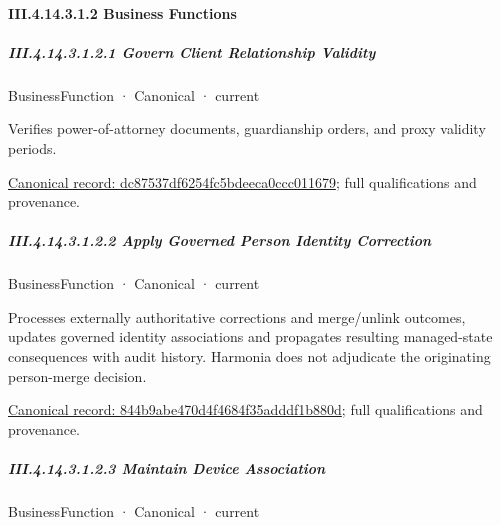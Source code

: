 \paragraph*{III.4.14.3.1.2 Business Functions}
\label{navigation:III.4.14.3.1.2}

\subparagraph*{III.4.14.3.1.2.1 Govern Client Relationship Validity}
\label{navigation:III.4.14.3.1.2.1}

\label{element:dc87537df6254fc5bdeeca0ccc011679}
{\small BusinessFunction · Canonical · current}\par

Verifies power-of-attorney documents, guardianship orders, and proxy validity periods.


{\footnotesize \href{../../../../continuum/business/business-function/dc87537df6254fc5bdeeca0ccc011679.md}{Canonical record: dc87537df6254fc5bdeeca0ccc011679}; full qualifications and provenance.}\par
\subparagraph*{III.4.14.3.1.2.2 Apply Governed Person Identity Correction}
\label{navigation:III.4.14.3.1.2.2}

\label{element:844b9abe470d4f4684f35adddf1b880d}
{\small BusinessFunction · Canonical · current}\par

Processes externally authoritative corrections and merge/unlink outcomes, updates governed identity associations and propagates resulting managed-state consequences with audit history. Harmonia does not adjudicate the originating person-merge decision.


{\footnotesize \href{../../../../continuum/business/business-function/844b9abe470d4f4684f35adddf1b880d.md}{Canonical record: 844b9abe470d4f4684f35adddf1b880d}; full qualifications and provenance.}\par
\subparagraph*{III.4.14.3.1.2.3 Maintain Device Association}
\label{navigation:III.4.14.3.1.2.3}

\label{element:fc0f4d9c781241359d783d26f038b7ff}
{\small BusinessFunction · Canonical · current}\par

